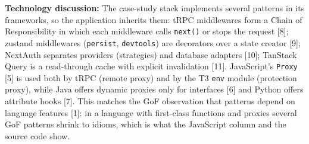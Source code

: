 \documentclass[11pt,a4paper]{article}
\newcommand{\entry}[2]{\textbf{#1:} #2\par}
\begin{document}
\entry{Technology discussion}{The case-study stack implements several patterns in its frameworks, so the application inherits them: tRPC middlewares form a Chain of Responsibility in which each middleware calls \texttt{next()} or stops the request [8]; zustand middlewares (\texttt{persist}, \texttt{devtools}) are decorators over a state creator [9]; NextAuth separates providers (strategies) and database adapters [10]; TanStack Query is a read-through cache with explicit invalidation [11]. JavaScript's \texttt{Proxy} [5] is used both by tRPC (remote proxy) and by the T3 \texttt{env} module (protection proxy), while Java offers dynamic proxies only for interfaces [6] and Python offers attribute hooks [7]. This matches the GoF observation that patterns depend on language features [1]: in a language with first-class functions and proxies several GoF patterns shrink to idioms, which is what the JavaScript column and the source code show.}
\end{document}
